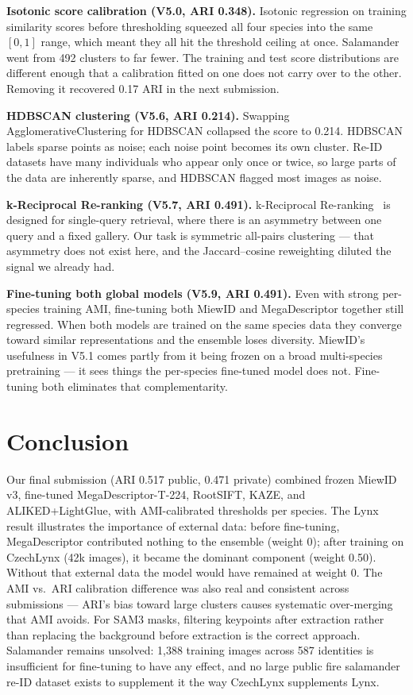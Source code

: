 \documentclass[]{ceurart}
\begin{document}
\textbf{Isotonic score calibration (V5.0, ARI 0.348).}
Isotonic regression on training similarity scores before thresholding squeezed all
four species into the same $[0,1]$ range, which meant they all hit the threshold
ceiling at once. Salamander went from 492 clusters to far fewer. The training and
test score distributions are different enough that a calibration fitted on one
does not carry over to the other. Removing it recovered 0.17 ARI in the next
submission.

\textbf{HDBSCAN clustering (V5.6, ARI 0.214).}
Swapping AgglomerativeClustering for HDBSCAN collapsed the score to 0.214.
HDBSCAN labels sparse points as noise; each noise point becomes its own cluster.
Re-ID datasets have many individuals who appear only once or twice, so large parts
of the data are inherently sparse, and HDBSCAN flagged most images as noise.

\textbf{k-Reciprocal Re-ranking (V5.7, ARI 0.491).}
k-Reciprocal Re-ranking~\cite{zhong2017reranking} is designed for single-query
retrieval, where there is an asymmetry between one query and a fixed gallery.
Our task is symmetric all-pairs clustering --- that asymmetry does not exist here,
and the Jaccard--cosine reweighting diluted the signal we already had.

\textbf{Fine-tuning both global models (V5.9, ARI 0.491).}
Even with strong per-species training AMI, fine-tuning both MiewID and
MegaDescriptor together still regressed. When both models are trained on the same
species data they converge toward similar representations and the ensemble loses
diversity. MiewID's usefulness in V5.1 comes partly from it being frozen on a
broad multi-species pretraining --- it sees things the per-species fine-tuned
model does not. Fine-tuning both eliminates that complementarity.

\section{Conclusion}

Our final submission (ARI 0.517 public, 0.471 private) combined frozen MiewID v3,
fine-tuned MegaDescriptor-T-224, RootSIFT, KAZE, and ALIKED+LightGlue, with
AMI-calibrated thresholds per species. The Lynx result illustrates the importance of external data: before fine-tuning,
MegaDescriptor contributed nothing to the ensemble (weight 0); after training on
CzechLynx (42k images), it became the dominant component (weight 0.50). Without
that external data the model would have remained at weight 0. The AMI vs.\ ARI
calibration difference was also real and consistent across submissions --- ARI's
bias toward large clusters causes systematic over-merging that AMI avoids. For
SAM3 masks, filtering keypoints after extraction rather than replacing the
background before extraction is the correct approach. Salamander remains
unsolved: 1,388 training images across 587 identities is insufficient for
fine-tuning to have any effect, and no large public fire salamander re-ID
dataset exists to supplement it the way CzechLynx supplements Lynx.
\end{document}
